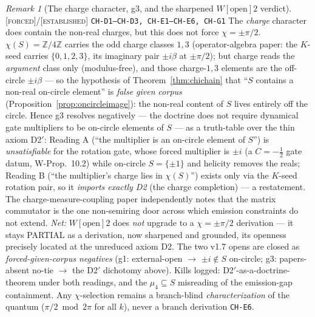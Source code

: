 \documentclass[11pt]{article}
\newcommand{\tagF}{\textcolor{cF}{\textsc{[forced]}}}
\newcommand{\tagE}{\textcolor{cE}{\textsc{[established]}}}
\newcommand{\hx}[1]{\textcolor{cC}{\footnotesize\texttt{#1}}}
\newcommand{\Z}{\mathbb{Z}}
\theoremstyle{plain}
\theoremstyle{definition}
\theoremstyle{remark}
\newtheorem{remark}[theorem]{Remark}
\begin{document}
\begin{remark}[The charge character, g3, and the sharpened {$W[\text{open}]2$} verdict]\label{rem:chidoctrine}\tagF{}/\tagE{} \hx{CH-D1--CH-D3, CH-E1--CH-E6, CH-G1}
The \emph{charge} character does contain the non-real charges, but this does
not force $\chi=\pm\pi/2$. $\chi(S)=\Z/4\Z$ carries the odd charge classes
$1,3$ (operator-algebra paper: the $K$-seed carries $\{0,1,2,3\}$, its
imaginary pair $\pm i\beta$ at $\pm\pi/2$); but charge reads the
\emph{argument} class only (modulus-free), and those charge-$1,3$ elements are
the off-circle $\pm i\beta$ --- so the hypothesis of Theorem~\ref{thm:chichain}
that ``$S$ contains a non-real on-circle element'' is \emph{false given corpus}
(Proposition~\ref{prop:oncircleimage}): the non-real content of $S$ lives
entirely off the circle. Hence g3 resolves negatively --- the doctrine does not
require dynamical gate multipliers to be on-circle elements of $S$ --- as a
truth-table over the thin axiom D2$'$: Reading A (``the multiplier is an
on-circle element of $S$'') is \emph{unsatisfiable} for the rotation gate,
whose forced multiplier is $\pm i$ (a $C=-\tfrac12$ gate datum, W-Prop.\ 10.2)
while on-circle $S=\{\pm1\}$ and helicity removes the reals; Reading B (``the
multiplier's charge lies in $\chi(S)$'') exists only via the $K$-seed rotation
pair, so it \emph{imports exactly D2} (the charge completion) --- a
restatement. The charge-measure-coupling paper independently notes that the
matrix commutator is the one non-semiring door across which emission
constraints do not extend. \emph{Net:} $W[\text{open}]2$ does \emph{not}
upgrade to a $\chi=\pm\pi/2$ derivation --- it stays PARTIAL as a derivation,
now sharpened and grounded, its openness precisely located at the unreduced
axiom D2. The two v1.7 opens are closed as \emph{forced-given-corpus negatives}
(g1: external-open $\to$ $\pm i\notin S$ on-circle; g3: papers-absent no-tie
$\to$ the D2$'$ dichotomy above). Kills logged: D2$'$-as-a-doctrine-theorem
under both readings, and the $\mu_4\subseteq S$ misreading of the emission-gap
containment. Any $\chi$-selection remains a branch-blind
\emph{characterization} of the quantum ($\pi/2\bmod2\pi$ for all $k$), never a
branch derivation \hx{CH-E6}.
\end{remark}
\end{document}

